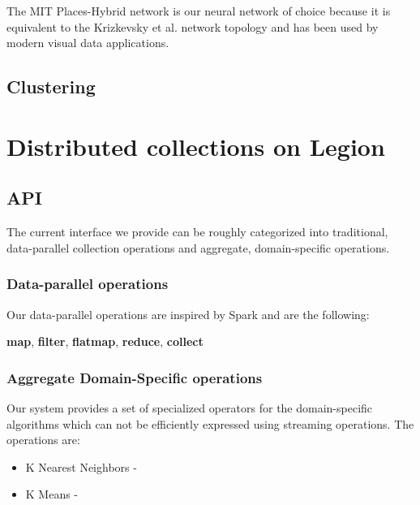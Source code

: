 \documentclass[tog]{acmsiggraph}
\begin{document}
The MIT Places-Hybrid network \cite{zhou2014learning} is our neural network of
choice because it is equivalent to the Krizkevsky et al. network topology
\cite{NIPS2012_4824} and has been used by modern visual data applications.

\subsection{Clustering}

\section{Distributed collections on Legion}

\subsection{API}

The current interface we provide can be roughly categorized into traditional,
data-parallel collection operations and aggregate, domain-specific
operations.

\subsubsection{Data-parallel operations}
Our data-parallel operations are inspired by Spark and are the
following:

\textbf{map}, \textbf{filter}, \textbf{flatmap}, \textbf{reduce},
\textbf{collect}

\subsubsection{Aggregate Domain-Specific operations}
Our system provides a set of specialized operators for the domain-specific
algorithms which can not be efficiently expressed using streaming
operations. The operations are:

\begin{itemize}
\item K Nearest Neighbors - 
\item K Means - 
\end{itemize}
\end{document}
